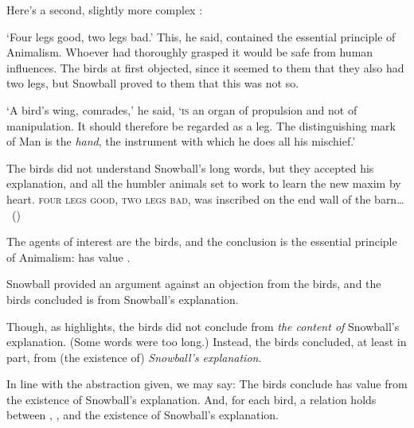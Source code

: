 \begin{note}
  Here's a second, slightly more complex :

  \begin{scenario}[Animalism]%
    \label{scen:animalism}%
    `Four legs good, two legs bad.'
    This, he said, contained the essential principle of Animalism.
    Whoever had thoroughly grasped it would be safe from human influences.
    The birds at first objected, since it seemed to them that they also had two legs, but Snowball proved to them that this was not so.

    `A bird's wing, comrades,' he said, `\textsc{is} an organ of propulsion and not of manipulation.
    It should therefore be regarded as a leg.
    The distinguishing mark of Man is the \emph{hand}, the instrument with which he does all his mischief.'

    The birds did not understand Snowball's long words, but they accepted his explanation, and all the humbler animals set to work to learn the new maxim by heart.
    \textsc{four legs good, two legs bad}, was inscribed on the end wall of the barn\dots%
    \mbox{ }\hfill\mbox{(\cite[25]{Orwell:1976aa})}%
    \newline
  \end{scenario}

  \noindent%
  The agents of interest are the birds, and the conclusion is the essential principle of Animalism:
   has value .

  Snowball provided an argument against an objection from the birds, and the birds concluded  is  from Snowball's explanation.

  Though, as \citeauthor{Orwell:1976aa} highlights, the birds did not conclude  from \emph{the content of} Snowball's explanation.
  (Some words were too long.)
  Instead, the birds concluded, at least in part, from (the existence of) \emph{Snowball's explanation}.

\end{note}

\begin{note}
  In line with the abstraction given, we may say:
  The birds conclude  has value  from the existence of Snowball's explanation.
  And, for each bird, a relation holds between , , and the existence of Snowball's explanation.
\end{note}


